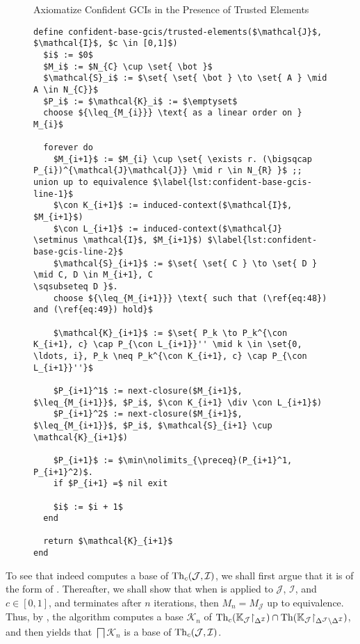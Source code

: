 
\begin{figure}[tp]
  \begin{Algorithm} Axiomatize Confident GCIs in the Presence of Trusted Elements
    \hspace*{0cm}
    \label{alg:confident-base-gcis/trusted-objects}
    \begin{lstlisting}
define confident-base-gcis/trusted-elements($\mathcal{J}$, $\mathcal{I}$, $c \in [0,1]$)
  $i$ := $0$
  $M_i$ := $N_{C} \cup \set{ \bot }$
  $\mathcal{S}_i$ := $\set{ \set{ \bot } \to \set{ A } \mid A \in N_{C}}$
  $P_i$ := $\mathcal{K}_i$ := $\emptyset$
  choose ${\leq_{M_{i}}} \text{ as a linear order on } M_{i}$
  
  forever do
    $M_{i+1}$ := $M_{i} \cup \set{ \exists r. (\bigsqcap P_{i})^{\mathcal{J}\mathcal{J}} \mid r \in N_{R} }$ ;; union up to equivalence $\label{lst:confident-base-gcis-line-1}$
    $\con K_{i+1}$ := induced-context($\mathcal{I}$, $M_{i+1}$)
    $\con L_{i+1}$ := induced-context($\mathcal{J} \setminus \mathcal{I}$, $M_{i+1}$) $\label{lst:confident-base-gcis-line-2}$
    $\mathcal{S}_{i+1}$ := $\set{ \set{ C } \to \set{ D } \mid C, D \in M_{i+1}, C
\sqsubseteq D }$.
    choose ${\leq_{M_{i+1}}} \text{ such that (\ref{eq:48}) and (\ref{eq:49}) hold}$

    $\mathcal{K}_{i+1}$ := $\set{ P_k \to P_k^{\con K_{i+1}, c} \cap P_{\con L_{i+1}}'' \mid k \in \set{0, \ldots, i}, P_k \neq P_k^{\con K_{i+1}, c} \cap P_{\con L_{i+1}}''}$

    $P_{i+1}^1$ := next-closure($M_{i+1}$, $\leq_{M_{i+1}}$, $P_i$, $\con K_{i+1} \div \con L_{i+1}$)
    $P_{i+1}^2$ := next-closure($M_{i+1}$, $\leq_{M_{i+1}}$, $P_i$, $\mathcal{S}_{i+1} \cup \mathcal{K}_{i+1}$)

    $P_{i+1}$ := $\min\nolimits_{\preceq}(P_{i+1}^1, P_{i+1}^2)$.
    if $P_{i+1} =$ nil exit

    $i$ := $i + 1$
  end

  return $\mathcal{K}_{i+1}$  
end
    \end{lstlisting}
  \end{Algorithm}
\end{figure}

To see that  indeed computes a base of
$\operatorname{Th}_{c}(\mathcal{J}, \mathcal{I})$, we shall first argue that it is of the form of
.  Thereafter, we shall show
that when  is applied to $\mathcal{J}$,
$\mathcal{I}$, and $c \in [0,1]$, and terminates after $n$ iterations, then $M_{n} =
M_{\mathcal{J}}$ up to equivalence.  Thus, by
, the
algorithm computes a base $\mathcal{K}_{n}$ of $\operatorname{Th}_{c}({\mathbb{K}}_{\mathcal{J}}
\mathord{\upharpoonright}_{\Delta^{\mathcal{I}}}) \cap \operatorname{Th}({\mathbb{K}}_{\mathcal{J}}
\mathord{\upharpoonright}_{\Delta^{\mathcal{J}} \setminus \Delta^{\mathcal{I}}})$, and then
 yields that
$\bigsqcap \mathcal{K}_{n}$ is a base of $\operatorname{Th}_{c}(\mathcal{J}, \mathcal{I})$.

